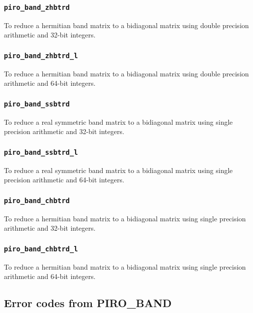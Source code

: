 \documentclass[11pt]{article}
\begin{document}
\subsubsection{{\tt piro\_band\_zhbtrd}}

To reduce a hermitian band matrix to a bidiagonal matrix using double 
precision arithmetic and 32-bit integers.

\subsubsection{{\tt piro\_band\_zhbtrd\_l}}

To reduce a hermitian band matrix to a bidiagonal matrix using double 
precision arithmetic and 64-bit integers.

\subsubsection{{\tt piro\_band\_ssbtrd}}

To reduce a real symmetric band matrix to a bidiagonal matrix using single 
precision arithmetic and 32-bit integers.

\subsubsection{{\tt piro\_band\_ssbtrd\_l}}

To reduce a real symmetric band matrix to a bidiagonal matrix using single 
precision arithmetic and 64-bit integers.

\subsubsection{{\tt piro\_band\_chbtrd}}

To reduce a hermitian band matrix to a bidiagonal matrix using single 
precision arithmetic and 32-bit integers.

\subsubsection{{\tt piro\_band\_chbtrd\_l}}

To reduce a hermitian band matrix to a bidiagonal matrix using single 
precision arithmetic and 64-bit integers.

\subsection{Error codes from PIRO\_BAND}
\label{err_code}
\end{document}
